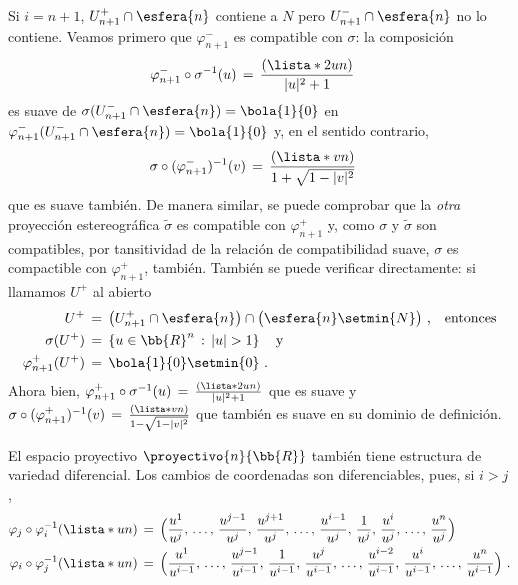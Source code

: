 \begin{ejemplo}
	Si $i=n+1$, $U_{n+1}^{+}\cap\esfera{n}$ contiene a $N$ pero
	$U_{n+1}^{-}\cap\esfera{n}$ no lo contiene. Veamos primero que
	$\varphi_{n+1}^{-}$ es compatible con $\sigma$: la composici\'{o}n
	\begin{align*}
		\varphi_{n+1}^{-}\circ\sigma^{-1}(u) & \,=\,
			\frac{(\lista*{2u}{n})}{|u|^{2}+1}
	\end{align*}
	es suave de $\sigma(U_{n+1}^{-}\cap\esfera{n})=\bola{1}{0}$ en
	$\varphi_{n+1}^{-}(U_{n+1}^{-}\cap\esfera{n})=\bola{1}{0}$ y, en el
	sentido contrario,
	\begin{align*}
		\sigma\circ(\varphi_{n+1}^{-})^{-1}(v) & \,=\,
			\frac{(\lista*{v}{n})}{1+\sqrt{1-|v|^{2}}}
	\end{align*}
	que es suave tambi\'{e}n. De manera similar, se puede comprobar que
	la \emph{otra} proyecci\'{o}n estereogr\'{a}fica $\tilde{\sigma}$
	es compatible con $\varphi_{n+1}^{+}$ y, como $\sigma$ y
	$\tilde{\sigma}$ son compatibles, por tansitividad de la relaci\'{o}n
	de compatibilidad suave, $\sigma$ es compactible con
	$\varphi_{n+1}^{+}$, tambi\'{e}n. Tambi\'{e}n se puede verificar
	directamente: si llamamos $U^{+}$ al abierto
	\begin{align*}
		U^{+} & \,=\,\big(U_{n+1}^{+}\cap\esfera{n}\big)\cap
			\big(\esfera{n}\setmin\{N\}\big)
			\text{ ,}\quad\text{entonces} \\
		\sigma(U^{+}) & \,=\,\left\lbrace u\in\bb{R}^{n}\,:\,
					|u|>1\right\rbrace
			\quad\text{y} \\
		\varphi_{n+1}^{+}(U^{+}) & \,=\,\bola{1}{0}\setmin\{0\}
		\text{ .}
	\end{align*}
	Ahora bien,
	\begin{math}
		\varphi_{n+1}^{+}\circ\sigma^{-1}(u) \,=\,
			\frac{(\lista*{2u}{n})}{|u|^{2}+1}
	\end{math}
	que es suave y
	\begin{math}
		\sigma\circ(\varphi_{n+1}^{+})^{-1}(v) \,=\,
			\frac{(\lista*{v}{n})}{1-\sqrt{1-|v|^{2}}}
	\end{math}
	que tambi\'{e}n es suave en su dominio de definici\'{o}n.
\end{ejemplo}

\begin{ejemplo}
	El espacio proyectivo $\proyectivo{n}{\bb{R}}$ tambi\'{e}n tiene
	estructura de variedad diferencial. Los cambios de coordenadas
	son diferenciables, pues, si $i>j$,
	\begin{align*}
		\varphi_{j}\circ\varphi_{i}^{-1}(\lista*{u}{n}) & \,=\,
		\Big(\frac{u^{1}}{u^{j}},\,\dots,\,\frac{u^{j-1}}{u^{j}},\,
			\frac{u^{j+1}}{u^{j}},\,\dots,\,\frac{u^{i-1}}{u^{j}},\,
			\frac{1}{u^{j}},\,\frac{u^{i}}{u^{j}},\,\dots,\,
				\frac{u^{n}}{u^{j}}\Big) \\
		\varphi_{i}\circ\varphi_{j}^{-1}(\lista*{u}{n}) & \,=\,
		\Big(\frac{u^{1}}{u^{i-1}},\,\dots,\,\frac{u^{j-1}}{u^{i-1}},\,
			\frac{1}{u^{i-1}},\,\frac{u^{j}}{u^{i-1}},\,\dots,\,
			\frac{u^{i-2}}{u^{i-1}},\,\frac{u^{i}}{u^{i-1}},\,
			\dots,\,\frac{u^{n}}{u^{i-1}}\Big)
		\text{ .}
	\end{align*}
\end{ejemplo}

